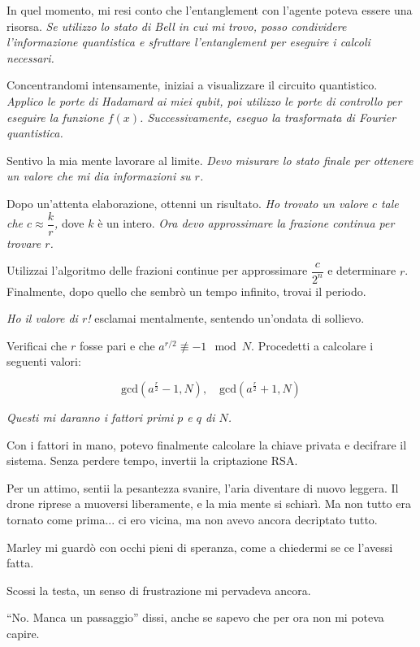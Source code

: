 In quel momento, mi resi conto che l'entanglement con l'agente poteva essere una risorsa. \emph{Se utilizzo lo stato di Bell in cui mi trovo, posso condividere l'informazione quantistica e sfruttare l'entanglement per eseguire i calcoli necessari.}

Concentrandomi intensamente, iniziai a visualizzare il circuito quantistico. \emph{Applico le porte di Hadamard ai miei qubit, poi utilizzo le porte di controllo per eseguire la funzione \( f(x) \). Successivamente, eseguo la trasformata di Fourier quantistica.}

Sentivo la mia mente lavorare al limite. \emph{Devo misurare lo stato finale per ottenere un valore che mi dia informazioni su \( r \).}

Dopo un'attenta elaborazione, ottenni un risultato. \emph{Ho trovato un valore \( c \) tale che \( c \approx \dfrac{k}{r} \),} dove \( k \) è un intero. \emph{Ora devo approssimare la frazione continua per trovare \( r \).}

Utilizzai l'algoritmo delle frazioni continue per approssimare \( \dfrac{c}{2^n} \) e determinare \( r \). Finalmente, dopo quello che sembrò un tempo infinito, trovai il periodo.

\emph{Ho il valore di \( r \)!} esclamai mentalmente, sentendo un'ondata di sollievo.

Verificai che \( r \) fosse pari e che \( a^{r/2} \not\equiv -1 \mod N \). Procedetti a calcolare i seguenti valori:

\[
\text{gcd}\left(a^{\frac{r}{2}} - 1, N\right), \quad \text{gcd}\left(a^{\frac{r}{2}} + 1, N\right)
\]

\emph{Questi mi daranno i fattori primi \( p \) e \( q \) di \( N \).}

Con i fattori in mano, potevo finalmente calcolare la chiave privata e decifrare il sistema. Senza perdere tempo, invertii la criptazione RSA.

Per un attimo, sentii la pesantezza svanire, l'aria diventare di nuovo leggera. Il drone riprese a muoversi liberamente, e la mia mente si schiarì. Ma non tutto era tornato come prima... ci ero vicina, ma non avevo ancora decriptato tutto.

Marley mi guardò con occhi pieni di speranza, come a chiedermi se ce l'avessi fatta.

Scossi la testa, un senso di frustrazione mi pervadeva ancora.

\begin{dialogue}
 \enquote{No. Manca un passaggio} dissi, anche se sapevo che per ora non mi poteva capire. 
\end{dialogue}


